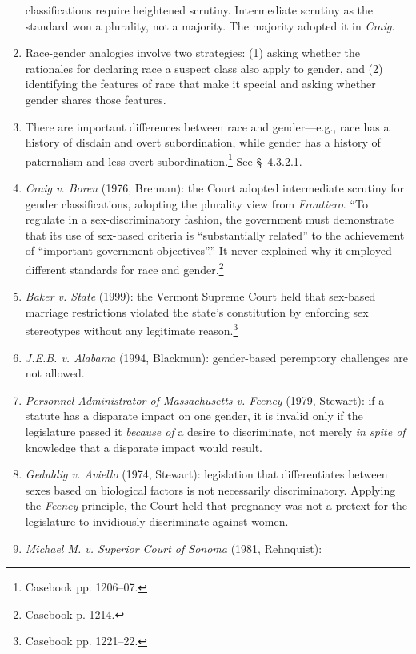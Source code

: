 \begin{enumerate}
    classifications require heightened scrutiny. Intermediate scrutiny as the 
    standard won a plurality, not a majority. The majority adopted it in 
    \emph{Craig}.
    \item Race-gender analogies involve two strategies: (1) asking whether the 
    rationales for declaring race a suspect class also apply to gender, and 
    (2) identifying the features of race that make it special and asking 
    whether gender shares those features.
    \item There are important differences between race and gender---e.g., race 
    has a history of disdain and overt subordination, while gender has a 
    history of paternalism and less overt subordination.\footnote{Casebook pp. 
    1206--07.} See \S\ 4.3.2.1.
    \item \emph{Craig v. Boren} (1976, Brennan): the Court adopted 
    intermediate scrutiny for gender classifications, adopting the plurality 
    view from \emph{Frontiero}. ``To regulate in a sex-discriminatory fashion, 
    the government must demonstrate that its use of sex-based criteria is 
    \enquote{substantially related} to the achievement of \enquote{important 
    government objectives}.'' It never explained why it employed different 
    standards for race and gender.\footnote{Casebook p. 1214.}
    \item \emph{Baker v. State} (1999): the Vermont Supreme Court held that 
    sex-based marriage restrictions violated the state's constitution by 
    enforcing sex stereotypes without any legitimate reason.\footnote{Casebook 
    pp. 1221--22.}
    \item \emph{J.E.B. v. Alabama} (1994, Blackmun): gender-based peremptory 
    challenges are not allowed.
    \item \emph{Personnel Administrator of Massachusetts v. 
    Feeney} (1979, Stewart): if a statute has a disparate impact on one 
    gender, it is invalid only if the legislature passed it \emph{because of} 
    a desire to discriminate, not merely \emph{in spite of} knowledge that a 
    disparate impact would result.
    \item  \emph{Geduldig v. Aviello} (1974, Stewart): legislation that 
    differentiates between sexes based on biological factors is not 
    necessarily discriminatory. Applying the \emph{Feeney} principle, the 
    Court held that pregnancy was not a pretext for the legislature to 
    invidiously discriminate against women.
    \item \emph{Michael M. v. Superior Court of Sonoma} (1981, Rehnquist): 

\end{enumerate}
